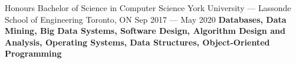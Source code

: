 

\begin{cventries}

  
  \cventryedu
    {Honours Bachelor of Science in Computer Science} %
    {York University — Lassonde School of Engineering} %
    {Toronto, ON} %
    {Sep 2017 — May 2020} %
    {\textbf{Databases, Data Mining, Big Data Systems, Software Design, Algorithm Design and Analysis, Operating Systems, Data Structures, Object-Oriented Programming}}
    
  

\end{cventries}
